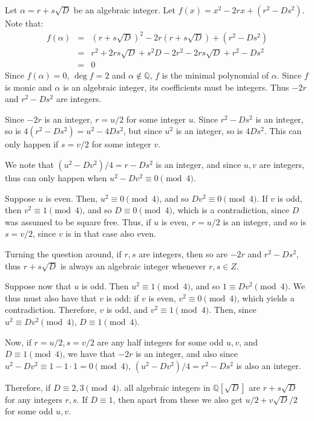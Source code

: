 \documentclass[notitlepage]{article}
\theoremstyle{definition}
\newcommand\Q{\mathbb{Q}}
\begin{document}
Let $\alpha = r + s \sqrt{D}$ be an algebraic integer. Let
$f(x) = x^2 - 2rx + (r^2 - Ds^2)$. Note that:
\begin{eqnarray}
  f(\alpha) &=& (r+s\sqrt{D})^2 -2r(r+s\sqrt{D}) + (r^2 - Ds^2) \\
            &=& r^2 + 2 rs\sqrt{D} + s^2 D - 2r^2 -2rs\sqrt{D} + r^2  - D s^2 \\
            &=& 0
\end{eqnarray}
Since $f(\alpha) = 0$, $\deg f = 2$ and $\alpha \not \in \Q$, $f$ is
the minimal polynomial of $\alpha$. Since $f$ is monic and $\alpha$ is
an algebraic integer, its coefficients must be integers. Thus $-2r$
and $r^2 - Ds^2$ are integers.

Since $-2r$ is an integer, $r = u/2$ for some integer $u$. Since
$r^2 - Ds^2$ is an integer, so is $4(r^2 - Ds^2) = u^2 - 4Ds^2$, but
since $u^2$ is an integer, so is $4Ds^2$. This can only happen if
$s = v/2$ for some integer $v$.

We note that $(u^2 - Dv^2)/4 = r - Ds^2$ is an integer, and since
$u, v$ are integers, thus can only happen when
$u^2 - Dv^2 \equiv 0  \pmod 4$.

Suppose $u$ is even. Then, $u^2 \equiv 0  \pmod 4$, and so
$D v^2 \equiv 0  \pmod 4$. If $v$ is odd, then $v^2 \equiv 1  \pmod 4$, and so
$D \equiv 0  \pmod 4$, which is a contradiction, since $D$ was assumed to
be square free. Thus, if $u$ is even, $r = u/2$ is an integer, and so
is $s = v/2$, since $v$ is in that case also even.

Turning the question around, if $r, s$ are integers, then so are $-2r$
and $r^2 - Ds^2$, thus $r + s \sqrt{D}$ is always an algebraic integer
whenever $r, s \in Z$.

Suppose now that $u$ is odd. Then $u^2 \equiv 1  \pmod 4$, and so
$1 \equiv Dv^2  \pmod 4$. We thus must also have that $v$ is odd: if $v$ is
even, $v^2 \equiv 0  \pmod 4$, which yields a contradiction. Therefore, $v$
is odd, and $v^2 \equiv 1  \pmod 4$. Then, since $u^2 \equiv D v^2  \pmod 4$,
$D \equiv 1  \pmod 4$.

Now, if $r = u/2, s = v/2$ are any half integers for some odd $u, v$,
and $D \equiv 1  \pmod 4$, we have that $-2r$ is an integer, and also since
$u^2 - D v^2 \equiv 1 - 1 \cdot 1 = 0  \pmod 4$,
$(u^2 - D v^2)/4 = r^2 - Ds^2$ is also an integer.

Therefore, if $D \equiv 2, 3  \pmod 4$. all algebraic integers in
$\Q[\sqrt{D}]$ are $r + s \sqrt{D}$ for any integers $r, s$. If
$D \equiv 1$, then apart from these we also get $u/2 + v\sqrt{D}/2$
for some odd $u, v$.
\end{document}
